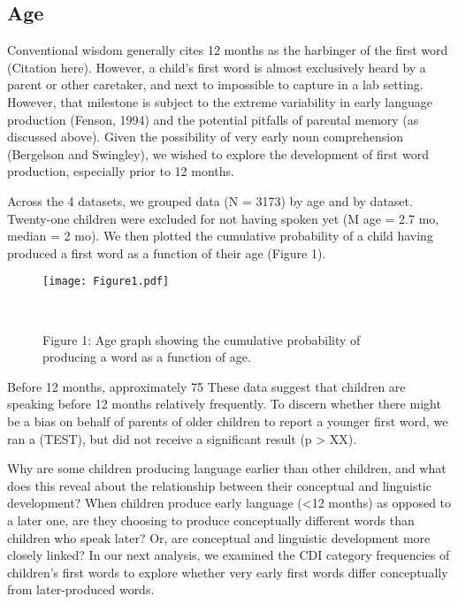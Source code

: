 \documentclass[10pt,letterpaper]{article}
\begin{document}
\subsection{Age} 
Conventional wisdom generally cites 12 months as the harbinger of the first word (Citation here). However, a child's first word is almost exclusively heard by a parent or other caretaker, and next to impossible to capture in a lab setting. However, that milestone is subject to the extreme variability in early language production (Fenson, 1994) and the potential pitfalls of parental memory (as discussed above). Given the possibility of very early noun comprehension (Bergelson and Swingley), we wished to explore the development of first word production, especially prior to 12 months.  \par
Across the 4 datasets, we grouped data (N = 3173) by age and by dataset. Twenty-one children were excluded for not having spoken yet (M age  = 2.7 mo, median = 2 mo). We then plotted the cumulative probability of a child having produced a first word as a function of their age (Figure 1).

\begin{figure}[t]
\begin{center}
\texttt{[image: Figure1.pdf]}
\end{center}
\caption{Figure 1: Age graph showing the cumulative probability of producing a word as a function of age.}\
\end{figure}

Before 12 months, approximately 75%
These data suggest that children are speaking before 12 months relatively frequently. To discern whether there might be a bias on behalf of parents of older children to report a younger first word, we ran a (TEST), but did not receive a significant result (p > XX). \par
Why are some children producing language earlier than other children, and what does this reveal about the relationship between their conceptual and linguistic development? When children produce early language (<12 months) as opposed to a later one, are they choosing to produce conceptually different words than children who speak later? Or, are conceptual and linguistic development more closely linked? In our next analysis, we examined the CDI category frequencies of children's first words to explore whether very early first words differ conceptually from later-produced words. 
\end{document}
